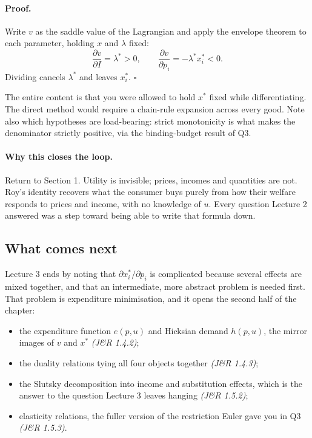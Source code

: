\documentclass[11pt]{article}
\theoremstyle{definition}
\newcommand{\xs}{x^*}
\newcommand{\pdd}[2]{\frac{\partial #1}{\partial #2}}
\newcommand{\src}[1]{\textit{\small (#1)}}
\begin{document}
\paragraph{Proof.} Write $v$ as the saddle value of the Lagrangian and apply the envelope
theorem to each parameter, holding $x$ and $\lambda$ fixed:
\[
\pdd{v}{I}=\lambda^*>0,
\qquad
\pdd{v}{p_i}=-\lambda^*x_i^*<0.
\]
Dividing cancels $\lambda^*$ and leaves $x_i^*$. \hfill$\square$

\vspace{3pt}
\noindent The entire content is that you were allowed to hold $\xs$ fixed while
differentiating. The direct method would require a chain-rule expansion across every good.
Note also which hypotheses are load-bearing: strict monotonicity is what makes the
denominator strictly positive, via the binding-budget result of Q3.

\paragraph{Why this closes the loop.} Return to Section 1. Utility is invisible; prices,
incomes and quantities are not. Roy's identity recovers what the consumer buys purely from
how their welfare responds to prices and income, with no knowledge of $u$. Every question
Lecture 2 answered was a step toward being able to write that formula down.

\subsection{What comes next}

Lecture 3 ends by noting that $\partial x_i^*/\partial p_i$ is complicated because several
effects are mixed together, and that an intermediate, more abstract problem is needed first.
That problem is expenditure minimisation, and it opens the second half of the chapter:

\begin{itemize}
\item the expenditure function $e(p,u)$ and Hicksian demand $h(p,u)$, the mirror images of
$v$ and $\xs$ \src{J\&R 1.4.2};
\item the duality relations tying all four objects together \src{J\&R 1.4.3};
\item the Slutsky decomposition into income and substitution effects, which is the answer to
the question Lecture 3 leaves hanging \src{J\&R 1.5.2};
\item elasticity relations, the fuller version of the restriction Euler gave you in Q3
\src{J\&R 1.5.3}.
\end{itemize}
\end{document}
